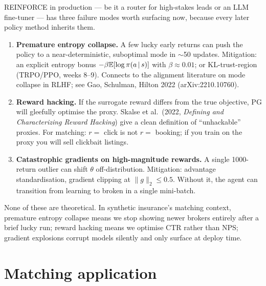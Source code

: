 \documentclass[11pt,oneside]{scrbook}
\begin{document}
\begin{safetyangle}
REINFORCE in production --- be it a router for high-stakes leads or an LLM fine-tuner --- has three failure modes worth surfacing now, because every later policy method inherits them.
\begin{enumerate}[leftmargin=*]
  \item \textbf{Premature entropy collapse.} A few lucky early returns can push the policy to a near-deterministic, suboptimal mode in $\sim$50 updates. Mitigation: an explicit entropy bonus $-\beta \mathbb{E}[\log \pi(a\,\vert\, s)]$ with $\beta\approx 0.01$; or KL-trust-region (TRPO/PPO, weeks 8--9). Connects to the alignment literature on mode collapse in RLHF; see Gao, Schulman, Hilton 2022 (arXiv:2210.10760).
  \item \textbf{Reward hacking.} If the surrogate reward differs from the true objective, PG will gleefully optimise the proxy. Skalse et al.\ (2022, \emph{Defining and Characterizing Reward Hacking}) give a clean definition of ``unhackable'' proxies. For matching: $r=$ click is not $r=$ booking; if you train on the proxy you will sell clickbait listings.
  \item \textbf{Catastrophic gradients on high-magnitude rewards.} A single 1000-return outlier can shift $\theta$ off-distribution. Mitigation: advantage standardisation, gradient clipping at $\|g\|_2 \le 0.5$. Without it, the agent can transition from learning to broken in a single mini-batch.
\end{enumerate}
None of these are theoretical. In synthetic insurance's matching context, premature entropy collapse means we stop showing newer brokers entirely after a brief lucky run; reward hacking means we optimise CTR rather than NPS; gradient explosions corrupt models silently and only surface at deploy time.
\end{safetyangle}

\chapter{Matching application}
\end{document}
